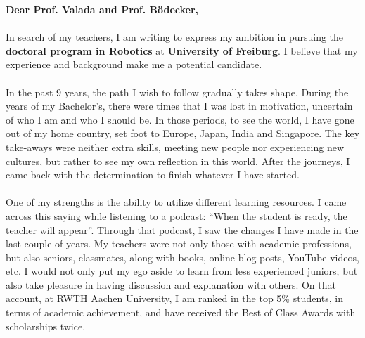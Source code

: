 \documentclass[
10pt, A4, english,
draft = false,
twoside = false,
]{article}
\begin{document}
	\onehalfspacing
	{\fontsize{12}{0}\selectfont		
		\textbf{Dear Prof. Valada and Prof. Bödecker,}\\~\\
		In search of my teachers, I am writing to express my ambition in pursuing the \textbf{doctoral program in Robotics} at \textbf{University of Freiburg}. I believe that my experience and background make me a potential candidate.\\~\\
		In the past 9 years, the path I wish to follow gradually takes shape. During the years of my Bachelor's, there were times that I was lost in motivation, uncertain of who I am and who I should be. In those periods, to see the world, I have gone out of my home country, set foot to Europe, Japan, India and Singapore. The key take-aways were neither extra skills, meeting new people nor experiencing new cultures, but rather to see my own reflection in this world. After the journeys, I came back with the determination to finish whatever I have started.\\~\\		
		One of my strengths is the ability to utilize different learning resources. I came across this saying while listening to a podcast: “When the student is ready, the teacher will appear”. Through that podcast, I saw the changes I have made in the last couple of years. My teachers were not only those with academic professions, but also seniors, classmates, along with books, online blog posts, YouTube videos, etc. I would not only put my ego aside to learn from less experienced juniors, but also take pleasure in having discussion and explanation with others. On that account, at RWTH Aachen University, I am ranked in the top 5\% students, in terms of academic achievement, and have received the Best of Class Awards with scholarships twice.\\~\\		
}
\end{document}
